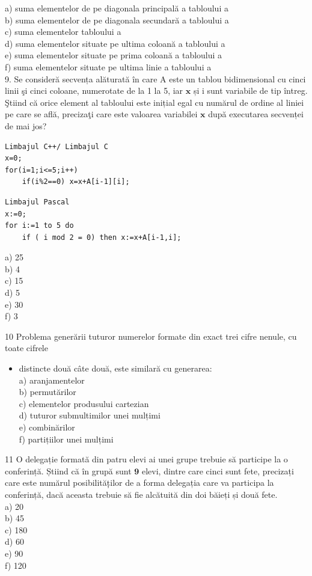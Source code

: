 \documentclass[10pt]{article}
\begin{document}
a) suma elementelor de pe diagonala principală a tabloului a\\
b) suma elementelor de pe diagonala secundară a tabloului a\\
c) suma elementelor tabloului a\\
d) suma elementelor situate pe ultima coloană a tabloului a\\
e) suma elementelor situate pe prima coloană a tabloului a\\
f) suma elementelor situate pe ultima linie a tabloului a\\
9. Se consideră secvența alăturată în care A este un tablou bidimensional cu cinci linii şi cinci coloane, numerotate de la 1 la 5, iar $\mathbf{x}$ și i sunt variabile de tip întreg. Ştiind că orice element al tabloului este inițial egal cu numărul de ordine al liniei pe care se află, precizaţi care este valoarea variabilei $\mathbf{x}$ după executarea secvenței de mai jos?

\begin{verbatim}
Limbajul C++/ Limbajul C
x=0;
for(i=1;i<=5;i++)
    if(i%2==0) x=x+A[i-1][i];
\end{verbatim}

\begin{verbatim}
Limbajul Pascal
x:=0;
for i:=1 to 5 do
    if ( i mod 2 = 0) then x:=x+A[i-1,i];
\end{verbatim}

a) 25\\
b) 4\\
c) 15\\
d) 5\\
e) 30\\
f) 3

10 Problema generării tuturor numerelor formate din exact trei cifre nenule, cu toate cifrele

\begin{itemize}
  \item distincte două câte două, este similară cu generarea:\\
a) aranjamentelor\\
b) permutărilor\\
c) elementelor produsului cartezian\\
d) tuturor submultimilor unei mulțimi\\
e) combinărilor\\
f) partițiilor unei mulțimi
\end{itemize}

11 O delegație formată din patru elevi ai unei grupe trebuie să participe la o conferință. Știind că în grupă sunt $\mathbf{9}$ elevi, dintre care cinci sunt fete, precizați care este numărul posibilităț̦ilor de a forma delegația care va participa la conferință, dacă aceasta trebuie să fie alcătuită din doi băieți și două fete.\\
a) 20\\
b) 45\\
c) 180\\
d) 60\\
e) 90\\
f) 120
\end{document}
